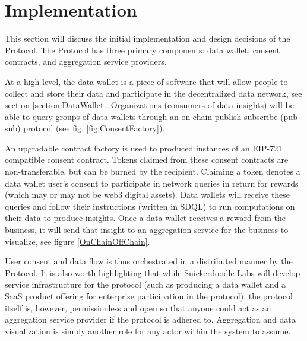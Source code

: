 \section{Implementation}
\label{section:Implementation}



This section will discuss the initial implementation and design decisions of the Protocol. The Protocol has three primary 
components: data wallet, consent contracts, and aggregation service providers.



At a high level, the data wallet is a piece of software that will allow people to collect and store their data and participate 
in the decentralized data network, see section \ref{section:DataWallet}. Organizations (consumers of data insights) will be able 
to query groups of data wallets through an on-chain publish-subscribe (pub-sub) protocol (see fig. \ref{fig:ConsentFactory}). 

An upgradable contract factory is used to produced instances of an EIP-721 compatible consent contract. Tokens claimed from these 
consent contracts are non-transferable, but can be burned by the recipient. Claiming a token denotes a data wallet user's consent 
to participate in network queries in return for rewards (which may or may not be web3 digital assets). Data wallets will receive 
these queries and follow their instructions (written in SDQL) to run computations on their data to produce insights. Once a data 
wallet receives a reward from the business, it will send that insight to an aggregation service for the business to visualize, see 
figure \ref{OnChainOffChain}. 



User consent and data flow is thus orchestrated in a distributed manner by the Protocol. It is also worth highlighting that while 
Snickerdoodle Labs will develop service infrastructure for the protocol (such as producing a data wallet and a SaaS product offering 
for enterprise participation in the protocol), the protocol itself is, however, permissionless and open so that anyone could act as 
an aggregation service provider if the protocol is adhered to. Aggregation and data visualization is simply another role for any 
actor within the system to assume.

